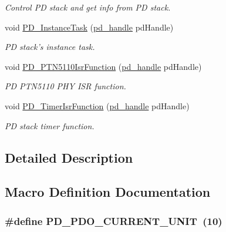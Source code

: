 \begin{DoxyCompactItemize}
\begin{DoxyCompactList}\small\item\em Control P\-D stack and get info from P\-D stack. \end{DoxyCompactList}\item 
void \hyperlink{group__usb__pd__stack_ga4227c58a9524464e19ee6efe9615f78e}{P\-D\-\_\-\-Instance\-Task} (\hyperlink{group__usb__pd__stack_ga9397835347d48ef48b6b0ecba6312213}{pd\-\_\-handle} pd\-Handle)
\begin{DoxyCompactList}\small\item\em P\-D stack's instance task. \end{DoxyCompactList}\item 
void \hyperlink{group__usb__pd__stack_gadc10377ece46e63b966463e501451e33}{P\-D\-\_\-\-P\-T\-N5110\-Isr\-Function} (\hyperlink{group__usb__pd__stack_ga9397835347d48ef48b6b0ecba6312213}{pd\-\_\-handle} pd\-Handle)
\begin{DoxyCompactList}\small\item\em P\-D P\-T\-N5110 P\-H\-Y I\-S\-R function. \end{DoxyCompactList}\item 
void \hyperlink{group__usb__pd__stack_gad8420ee79286dfb87b1b9d9c0845f31d}{P\-D\-\_\-\-Timer\-Isr\-Function} (\hyperlink{group__usb__pd__stack_ga9397835347d48ef48b6b0ecba6312213}{pd\-\_\-handle} pd\-Handle)
\begin{DoxyCompactList}\small\item\em P\-D stack timer function. \end{DoxyCompactList}\end{DoxyCompactItemize}


\subsection{Detailed Description}


\subsection{Macro Definition Documentation}
\hypertarget{group__usb__pd__stack_ga63746ad31eee8f5912a846952e6645b6}{
\subsubsection[{P\-D\-\_\-\-P\-D\-O\-\_\-\-C\-U\-R\-R\-E\-N\-T\-\_\-\-U\-N\-I\-T}]{\setlength{\rightskip}{0pt plus 5cm}\#define P\-D\-\_\-\-P\-D\-O\-\_\-\-C\-U\-R\-R\-E\-N\-T\-\_\-\-U\-N\-I\-T~(10)}}\label{group__usb__pd__stack_ga63746ad31eee8f5912a846952e6645b6}


